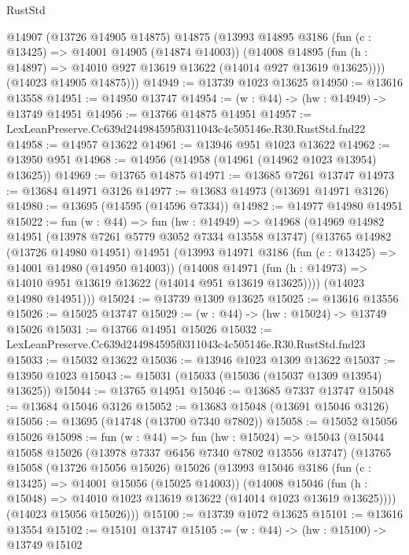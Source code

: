 \begin{lexlean}{RustStd}
\begin{coremodule}
        @14907
        (@13726 @14905 @14875)
        @14875
        (@13993
          @14895
          @3186
          (fun (c : @13425) => @14001 @14905 (@14874 @14003))
          (@14008
            @14895
            (fun (h : @14897) => @14010 @927 @13619 @13622 (@14014 @927 @13619 @13625))))
        (@14023 @14905 @14875)))
@14949 := @13739 @1023 @13625
@14950 := @13616 @13558
@14951 := @14950 @13747
@14954 := (w : @44) -> (hw : @14949) -> @13749 @14951
@14956 := @13766 @14875 @14951
@14957 := LexLeanPreserve.Cc639d244984595f0311043c4c505146e.R30.RustStd.fnd22
@14958 := @14957 @13622
@14961 := @13946 @951 @1023 @13622
@14962 := @13950 @951
@14968 := @14956 (@14958 (@14961 (@14962 @1023 @13954) @13625))
@14969 := @13765 @14875
@14971 := @13685 @7261 @13747
@14973 := @13684 @14971 @3126
@14977 := @13683 @14973 (@13691 @14971 @3126)
@14980 := @13695 (@14595 (@14596 @7334))
@14982 := @14977 @14980 @14951
@15022 := fun (w : @44) =>
  fun (hw : @14949) =>
  @14968
    (@14969
      @14982
      @14951
      (@13978 @7261 @5779 @3052 @7334 @13558 @13747)
      (@13765
        @14982
        (@13726 @14980 @14951)
        @14951
        (@13993
          @14971
          @3186
          (fun (c : @13425) => @14001 @14980 (@14950 @14003))
          (@14008
            @14971
            (fun (h : @14973) => @14010 @951 @13619 @13622 (@14014 @951 @13619 @13625))))
        (@14023 @14980 @14951)))
@15024 := @13739 @1309 @13625
@15025 := @13616 @13556
@15026 := @15025 @13747
@15029 := (w : @44) -> (hw : @15024) -> @13749 @15026
@15031 := @13766 @14951 @15026
@15032 := LexLeanPreserve.Cc639d244984595f0311043c4c505146e.R30.RustStd.fnd23
@15033 := @15032 @13622
@15036 := @13946 @1023 @1309 @13622
@15037 := @13950 @1023
@15043 := @15031 (@15033 (@15036 (@15037 @1309 @13954) @13625))
@15044 := @13765 @14951
@15046 := @13685 @7337 @13747
@15048 := @13684 @15046 @3126
@15052 := @13683 @15048 (@13691 @15046 @3126)
@15056 := @13695 (@14748 (@13700 @7340 @7802))
@15058 := @15052 @15056 @15026
@15098 := fun (w : @44) =>
  fun (hw : @15024) =>
  @15043
    (@15044
      @15058
      @15026
      (@13978 @7337 @6456 @7340 @7802 @13556 @13747)
      (@13765
        @15058
        (@13726 @15056 @15026)
        @15026
        (@13993
          @15046
          @3186
          (fun (c : @13425) => @14001 @15056 (@15025 @14003))
          (@14008
            @15046
            (fun (h : @15048) => @14010 @1023 @13619 @13622 (@14014 @1023 @13619 @13625))))
        (@14023 @15056 @15026)))
@15100 := @13739 @1072 @13625
@15101 := @13616 @13554
@15102 := @15101 @13747
@15105 := (w : @44) -> (hw : @15100) -> @13749 @15102

\end{coremodule}
\end{lexlean}
